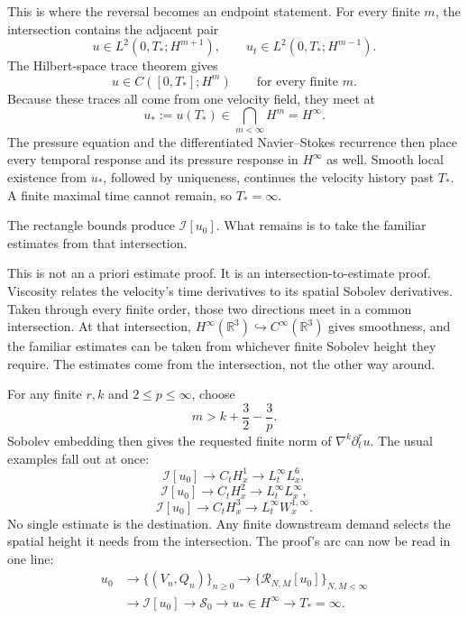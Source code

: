 \documentclass[11pt]{article}
\begin{document}
This is where the reversal becomes an endpoint statement. For every finite \(m\), the intersection contains the adjacent pair
\[
u\in L^2(0,T_*;H^{m+1}),
\qquad
u_t\in L^2(0,T_*;H^{m-1}).
\]
The Hilbert-space trace theorem gives
\[
u\in C([0,T_*];H^m)
\qquad\text{for every finite }m.
\]
Because these traces all come from one velocity field, they meet at
\[
u_*:=u(T_*)\in\bigcap_{m<\infty}H^m=H^\infty.
\]
The pressure equation and the differentiated Navier--Stokes recurrence then place every temporal response and its pressure response in \(H^\infty\) as well. Smooth local existence from \(u_*\), followed by uniqueness, continues the velocity history past \(T_*\). A finite maximal time cannot remain, so \(T_*=\infty\).

The rectangle bounds produce \(\mathcal I[u_0]\). What remains is to take the familiar estimates from that intersection.

This is not an a priori estimate proof. It is an intersection-to-estimate proof. Viscosity relates the velocity's time derivatives to its spatial Sobolev derivatives. Taken through every finite order, those two directions meet in a common intersection. At that intersection, \(H^\infty(\mathbb R^3)\hookrightarrow C^\infty(\mathbb R^3)\) gives smoothness, and the familiar estimates can be taken from whichever finite Sobolev height they require. The estimates come from the intersection, not the other way around.

For any finite \(r,k\) and \(2\leq p\leq\infty\), choose
\[
m>k+\frac32-\frac3p.
\]
Sobolev embedding then gives the requested finite norm of \(\nabla^k\partial_t^ru\). The usual examples fall out at once:
\[
\mathcal I[u_0]
\longrightarrow C_tH_x^1
\longrightarrow L_t^\infty L_x^6,
\]
\[
\mathcal I[u_0]
\longrightarrow C_tH_x^2
\longrightarrow L_t^\infty L_x^\infty,
\]
\[
\mathcal I[u_0]
\longrightarrow C_tH_x^3
\longrightarrow L_t^\infty W_x^{1,\infty}.
\]
No single estimate is the destination. Any finite downstream demand selects the spatial height it needs from the intersection. The proof's arc can now be read in one line:
\[
\begin{aligned}
u_0
&\longrightarrow \{(V_n,Q_n)\}_{n\geq0}
\longrightarrow \{\mathcal R_{N,M}[u_0]\}_{N,M<\infty} \\
&\longrightarrow \mathcal I[u_0]
\longrightarrow \mathscr S_0
\longrightarrow u_*\in H^\infty
\longrightarrow T_*=\infty.
\end{aligned}
\]
\end{document}
